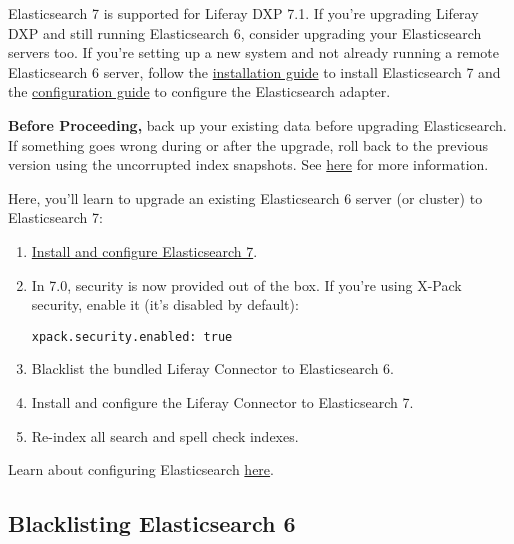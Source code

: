 Elasticsearch 7 is supported for Liferay DXP 7.1. If you're upgrading
Liferay DXP and still running Elasticsearch 6, consider upgrading your
Elasticsearch servers too. If you're setting up a new system and not
already running a remote Elasticsearch 6 server, follow the
\href{/docs/7-1/deploy/-/knowledge_base/d/installing-elasticsearch-7}{installation
guide} to install Elasticsearch 7 and the
\href{/docs/7-1/deploy/-/knowledge_base/d/configuring-the-liferay-elasticsearch-connector}{configuration
guide} to configure the Elasticsearch adapter.

\noindent\hrulefill

\textbf{Before Proceeding,} back up your existing data before upgrading
Elasticsearch. If something goes wrong during or after the upgrade, roll
back to the previous version using the uncorrupted index snapshots. See
\href{/docs/7-1/deploy/-/knowledge_base/d/backing-up-elasticsearch}{here}
for more information.

\noindent\hrulefill

Here, you'll learn to upgrade an existing Elasticsearch 6 server (or
cluster) to Elasticsearch 7:

\begin{enumerate}
\def\labelenumi{\arabic{enumi}.}
\item
  \href{/docs/7-1/deploy/-/knowledge_base/d/installing-elasticsearch-7}{Install
  and configure Elasticsearch 7}.
\item
  In 7.0, security is now provided out of the box. If you're using
  X-Pack security, enable it (it's disabled by default):

\begin{verbatim}
xpack.security.enabled: true
\end{verbatim}
\item
  Blacklist the bundled Liferay Connector to Elasticsearch 6.
\item
  Install and configure the Liferay Connector to Elasticsearch 7.
\item
  Re-index all search and spell check indexes.
\end{enumerate}

Learn about configuring Elasticsearch
\href{/docs/7-1/deploy/-/knowledge_base/d/configuring-the-liferay-elasticsearch-connector}{here}.

\subsection{Blacklisting Elasticsearch
6}\label{blacklisting-elasticsearch-6}

